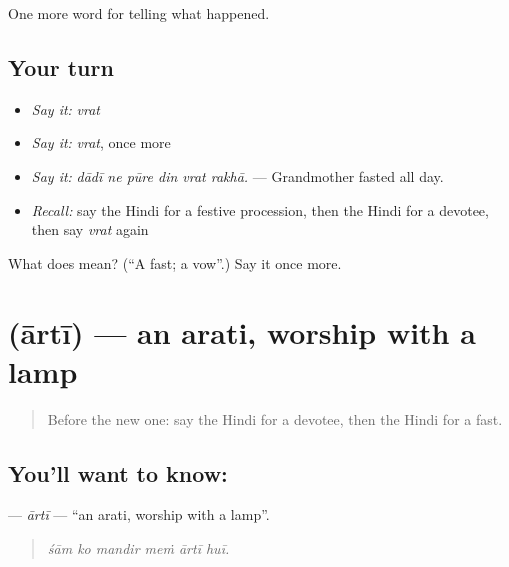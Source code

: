 \begin{grammarlens}[title={What you've built}]
One more word for telling what happened.
\end{grammarlens}

\subsection*{Your turn}
\begin{itemize}
\raggedright
  \item \emph{Say it:} \emph{vrat}
  \item \emph{Say it:} \emph{vrat}, once more
  \item \emph{Say it:} \emph{dādī ne pūre din vrat rakhā.} — Grandmother fasted all day.
  \item \emph{Recall:} say the Hindi for a festive procession, then the Hindi for a devotee, then say \emph{vrat} again
\end{itemize}

\begin{tcolorbox}[breakable,colback=teal!4,colframe=teal!35!black,title={Before you move on}]
What does  mean? (\textquotedblleft{}A fast; a vow\textquotedblright{}.) Say it once more.
\end{tcolorbox}
\section[\texorpdfstring{\hi{आरती} (ārtī)}{आरती (ārtī)}]{ (ārtī) — an arati, worship with a lamp}

\label{lesson:HI-C331-arti}



\begin{quote}
Before the new one: say the Hindi for a devotee, then the Hindi for a fast.
\end{quote}

\subsection*{You'll want to know: }
\textbf{} — \emph{ārtī} — \textquotedblleft{}an arati, worship with a lamp\textquotedblright{}.

\begin{quote}
     
\end{quote}

\begin{quote}
\emph{śām ko mandir meṁ ārtī huī.}
\end{quote}

